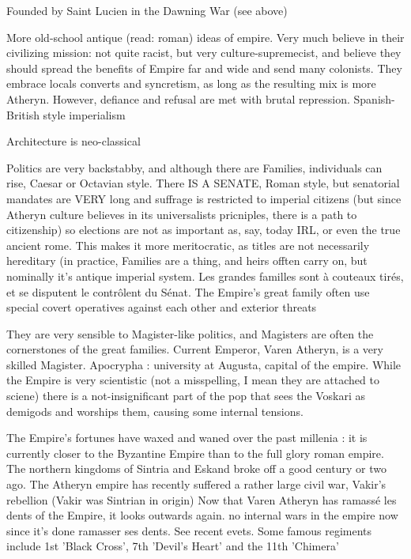 Founded by Saint Lucien in the Dawning War (see above)

More old-school antique (read: roman) ideas of empire. Very much believe in their civilizing mission: not quite racist, but very culture-supremecist, and believe they should spread the benefits of Empire far and wide and send many colonists. They embrace locals converts and syncretism, as long as the resulting mix is more Atheryn. However, defiance and refusal are met with brutal repression. 
Spanish-British style imperialism

Architecture is neo-classical

Politics are very backstabby, and although there are Families, individuals can rise, Caesar or Octavian style. There IS A SENATE, Roman style, but senatorial mandates are VERY long and suffrage is restricted to imperial citizens (but since Atheryn culture believes in its universalists pricniples, there is a path to citizenship) so elections are not as important as, say, today IRL, or even the true ancient rome. This makes it more meritocratic, as titles are not necessarily hereditary (in practice, Families are a thing, and heirs offten carry on, but nominally it's antique imperial system. Les grandes familles sont à couteaux tirés, et se disputent le contrôlent du Sénat. The Empire's great family often use special covert operatives against each other and exterior threats 

They are very sensible to Magister-like politics, and Magisters are often the cornerstones of the great families. Current Emperor, Varen Atheryn, is a very skilled Magister. Apocrypha : university at Augusta, capital of the empire. While the Empire is very scientistic (not a misspelling, I mean they are attached to sciene) there is a not-insignificant part of the pop that sees the Voskari as demigods and worships them, causing some internal tensions. 

The Empire's fortunes have waxed and waned over the past millenia : it is currently closer to the Byzantine Empire than to the full glory roman empire. The northern kingdoms of Sintria and Eskand broke off a good century or two ago. The Atheryn empire has recently suffered a rather large civil war, Vakir's rebellion (Vakir was Sintrian in origin) Now that Varen Atheryn has ramassé les dents of the Empire, it looks outwards again.  no internal wars in the empire now since it's done ramasser ses dents. See recent evets. Some famous regiments include 1st 'Black Cross', 7th 'Devil's Heart' and the 11th 'Chimera'


